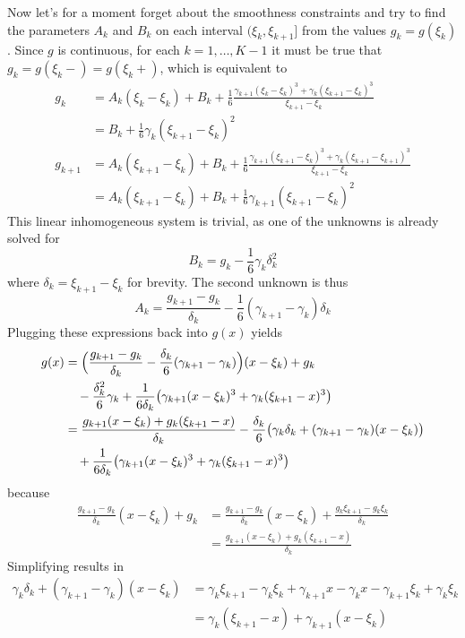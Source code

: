 \documentclass[a4paper]{article}
\begin{document}
Now let's for a moment forget about the smoothness constraints and try to find
the parameters $A_k$ and $B_k$ on each interval $(\xi_k,\xi_{k+1}]$ from the values
$g_k = g(\xi_k)$. Since $g$ is continuous, for each $k=1,\ldots,K-1$ it must be
true that $g_k = g(\xi_k-) = g(\xi_k+)$, which is equivalent to
\begin{align*}
	g_k &= A_k(\xi_k - \xi_k) + B_k + \frac{1}{6}
		\frac{\gamma_{k+1}(\xi_k-\xi_k)^3+\gamma_k(\xi_{k+1}-\xi_k)^3}{\xi_{k+1}-\xi_k}\\
		&= B_k + \frac{1}{6} \gamma_k (\xi_{k+1}-\xi_k)^2\\
	g_{k+1} &= A_k(\xi_{k+1}-\xi_k) + B_k + \frac{1}{6}
		\frac{\gamma_{k+1}(\xi_{k+1}-\xi_k)^3+\gamma_k(\xi_{k+1}-\xi_{k+1})^3}{\xi_{k+1}-\xi_k}\\
		&= A_k(\xi_{k+1}-\xi_k) + B_k + \frac{1}{6} \gamma_{k+1}(\xi_{k+1}-\xi_k)^2
\end{align*}
This linear inhomogeneous system is trivial, as one of the unknowns is already
solved for 
\[B_k = g_k - \frac{1}{6} \gamma_k \delta_k^2\]
where $\delta_k = \xi_{k+1}-\xi_k$ for brevity. The second unknown is thus
\[A_k = \frac{g_{k+1} - g_k}{\delta_k} - \frac{1}{6} (\gamma_{k+1}-\gamma_k) \delta_k\]
Plugging these expressions back into $g(x)$ yields
\begin{align*}
	g(x) &= \Bigl(
			\frac{g_{k+1} - g_k}{\delta_k} - \frac{\delta_k}{6} (\gamma_{k+1}-\gamma_k)
		\Bigr)(x - \xi_k) + g_k\\
		&\quad- \frac{\delta_k^2}{6} \gamma_k
		+ \frac{1}{6\delta_k} \bigl(\gamma_{k+1}(x-\xi_k)^3+\gamma_k(\xi_{k+1}-x)^3\bigr)\\
		&= \frac{g_{k+1}(x - \xi_k) + g_k(\xi_{k+1} - x)}{\delta_k}
		- \frac{\delta_k}{6} \bigl( \gamma_k \delta_k + (\gamma_{k+1}-\gamma_k) (x - \xi_k) \bigr)\\
		&\quad+ \frac{1}{6\delta_k} \bigl(\gamma_{k+1}(x-\xi_k)^3+\gamma_k(\xi_{k+1}-x)^3\bigr)
\end{align*}
because
\begin{align*}
	\frac{g_{k+1} - g_k}{\delta_k}(x - \xi_k) + g_k
	&= \frac{g_{k+1} - g_k}{\delta_k}(x - \xi_k) + \frac{g_k\xi_{k+1} - g_k\xi_k}{\delta_k}\\
	&= \frac{g_{k+1}(x - \xi_k) + g_k(\xi_{k+1} - x)}{\delta_k}
\end{align*}
Simplifying results in
\begin{align*}
\gamma_k \delta_k + (\gamma_{k+1}-\gamma_k) (x - \xi_k)
	& = \gamma_k \xi_{k+1} - \gamma_k \xi_k
		+ \gamma_{k+1} x - \gamma_k x
		- \gamma_{k+1}\xi_k + \gamma_k \xi_k \\
	&= \gamma_k (\xi_{k+1}-x) + \gamma_{k+1} (x - \xi_k)
\end{align*}
\end{document}

